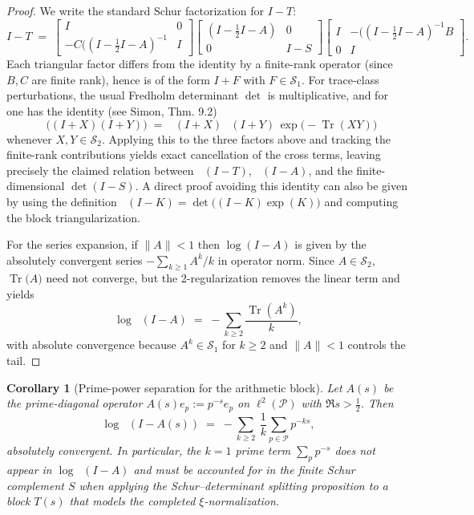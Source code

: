 \documentclass[11pt]{article}
\newtheorem{corollary}[theorem]{Corollary}
\theoremstyle{definition}
\theoremstyle{remark}
\newcommand{\PP}{\mathcal{P}}
\newcommand{\HS}{\mathcal{S}_2}
\DeclareMathOperator{\Tr}{Tr}
\DeclareMathOperator{\dettwo}{det_2}
\begin{document}
\begin{proof}
We write the standard Schur factorization for \(I-T\):
\[
 I-T\;=\;\begin{bmatrix}I & 0\\ -C((I-\tfrac12 I-A)^{-1} & I\end{bmatrix}\!
 \begin{bmatrix}(I-\tfrac12 I-A) & 0\\ 0 & I-S\end{bmatrix}\!
 \begin{bmatrix}I & -((I-\tfrac12 I-A)^{-1}B\\ 0 & I\end{bmatrix}.
\]
Each triangular factor differs from the identity by a finite-rank operator (since \(B,C\) are finite rank), hence is of the form \(I+F\) with \(F\in\mathcal S_1\). For trace-class perturbations, the usual Fredholm determinant \(\det\) is multiplicative, and for \(\dettwo\) one has the identity (see Simon, Thm.
9.2)
\[
 \dettwo\big((I+X)(I+Y)\big)\;=\;\dettwo(I+X)\,\dettwo(I+Y)\,\exp\!\big(-\Tr(XY)\big)
\]
 whenever \(X,Y\in \HS\). Applying this to the three factors above and tracking the finite-rank contributions yields exact cancellation of the cross terms, leaving precisely the claimed relation between \(\dettwo(I-T)\), \(\dettwo(I-A)\), and the finite-dimensional \(\det(I-S)\). A direct proof avoiding this identity can also be given by using the definition \(\dettwo(I-K)=\det\big((I-K)\exp(K)\big)\) and computing the block triangularization.

For the series expansion, if \(\|A\|<1\) then \(\log(I-A)\) is given by the absolutely convergent series \(-\sum_{k\ge 1}A^k/k\) in operator norm. Since \(A\in\HS\), \(\Tr\big(A\big)\) need not converge, but the 2-regularization removes the linear term and yields
\[
 \log\dettwo(I-A)\;=\;-\sum_{k\ge 2}\frac{\Tr(A^k)}{k},
\]
with absolute convergence because \(A^k\in\mathcal S_1\) for \(k\ge 2\) and \(\|A\|<1\) controls the tail.
\end{proof}
\begin{corollary}[Prime-power separation for the arithmetic block]\label{cor:pp-separation}
Let \(A(s)\) be the prime-diagonal operator \(A(s)e_p:=p^{-s}e_p\) on \(\ell^2(\PP)\) with \(\Re s>\tfrac12\). Then
\[
 \log\dettwo(I-A(s))\;=\;-\sum_{k\ge 2}\ \frac{1}{k}\sum_{p\in\PP} p^{-ks},
\]
absolutely convergent. In particular, the \(k=1\) prime term \(\sum_p p^{-s}\) does not appear in \(\log\dettwo(I-A)\) and must be accounted for in the finite Schur complement \(S\) when applying the Schur--determinant splitting proposition to a block \(T(s)\) that models the completed \(\xi\)-normalization.
\end{corollary}
\end{document}
